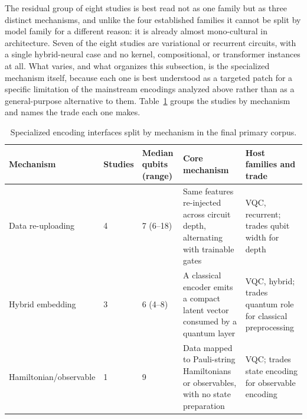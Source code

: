 \documentclass{ieeeaccess}
\begin{document}
The residual group of eight studies is best read not as one family but as three distinct mechanisms, and unlike the four established families it cannot be split by model family for a different reason: it is already almost mono-cultural in architecture. Seven of the eight studies are variational or recurrent circuits, with a single hybrid-neural case and no kernel, compositional, or transformer instances at all. What varies, and what organizes this subsection, is the specialized mechanism itself, because each one is best understood as a targeted patch for a specific limitation of the mainstream encodings analyzed above rather than as a general-purpose alternative to them. Table~\ref{tab:specialized_by_mechanism} groups the studies by mechanism and names the trade each one makes.

\begin{table}[t]
\caption{Specialized encoding interfaces split by mechanism in the final primary corpus.}
\label{tab:specialized_by_mechanism}
\centering
\scriptsize
\begin{tabular}{@{}p{} p{} p{} p{} p{}@{}}
\hline
\textbf{Mechanism} & \textbf{Studies} & \textbf{Median qubits (range)} & \textbf{Core mechanism} & \textbf{Host families and trade} \\
\hline
Data re-uploading & 4 & 7 (6--18) & Same features re-injected across circuit depth, alternating with trainable gates & VQC, recurrent; trades qubit width for depth \\
Hybrid embedding & 3 & 6 (4--8) & A classical encoder emits a compact latent vector consumed by a quantum layer & VQC, hybrid; trades quantum role for classical preprocessing \\
Hamiltonian/observable & 1 & 9 & Data mapped to Pauli-string Hamiltonians or observables, with no state preparation & VQC; trades state encoding for observable encoding \\
\hline
\end{tabular}
\end{table}
\end{document}
